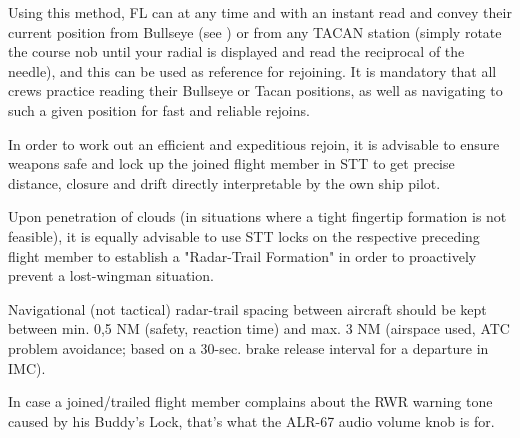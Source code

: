 Using this method, FL can at any time and with an instant read and convey their
current position from Bullseye (see ) or
from any TACAN station (simply rotate the course nob until your radial is
displayed and read the reciprocal of the needle), and this can be used as
reference for rejoining. It is mandatory that all crews practice reading their
Bullseye or Tacan positions, as well as navigating to such a given position for
fast and reliable rejoins.

In order to work out an efficient and expeditious rejoin, it is advisable to
ensure weapons safe and lock up the joined flight member in STT to get precise
distance, closure and drift directly interpretable by the own ship pilot.

Upon penetration of clouds (in situations where a tight fingertip formation is
not feasible), it is equally advisable to use STT locks on the respective
preceding flight member to establish a "Radar-Trail Formation" in order to
proactively prevent a lost-wingman situation.

Navigational (not tactical) radar-trail spacing between aircraft should be kept
between min. 0,5 NM (safety, reaction time) and max. 3 NM (airspace used, ATC
problem avoidance; based on a 30-sec. brake release interval for a departure in
IMC).

In case a joined/trailed flight member complains about the RWR warning tone
caused by his Buddy's Lock, that's what the ALR-67 audio volume knob is for.